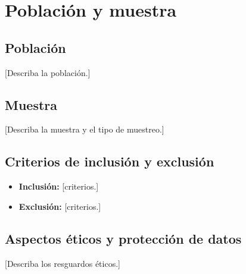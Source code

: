 \section{Población y muestra}

\subsection{Población}
[Describa la población.]

\subsection{Muestra}
[Describa la muestra y el tipo de muestreo.]

\subsection{Criterios de inclusión y exclusión}
\begin{itemize}
  \item \textbf{Inclusión:} [criterios.]
  \item \textbf{Exclusión:} [criterios.]
\end{itemize}

\subsection{Aspectos éticos y protección de datos}
[Describa los resguardos éticos.]
